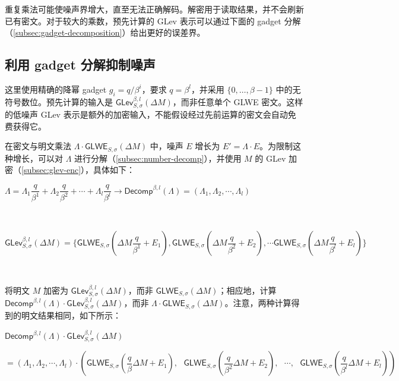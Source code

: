 重复乘法可能使噪声界增大，直至无法正确解码。解密用于读取结果，并不会刷新已有密文。对于较大的乘数，预先计算的 GLev 表示可以通过下面的 gadget 分解（\autoref{subsec:gadget-decomposition}）给出更好的误差界。

\subsection{利用 gadget 分解抑制噪声}
\label{subsubsec:gadget-decomposition-noise-suppression}

这里使用精确的降幂 gadget $g_i=q/\beta^i$，要求 $q=\beta^l$，并采用 $\{0,\ldots,\beta-1\}$ 中的无符号数位。预先计算的输入是 $\textsf{GLev}^{\beta,l}_{S,\sigma}(\Delta M)$，而非任意单个 GLWE 密文。这样的低噪声 GLev 表示是额外的加密输入，不能假设经过先前运算的密文会自动免费获得它。

在密文与明文乘法 $\Lambda \cdot \textsf{GLWE}_{S, \sigma}(\Delta M)$ 中，噪声 $E$ 增长为 $E' = \Lambda \cdot E$。为限制这种增长，可以对 $\Lambda$ 进行分解（\autoref{subsec:number-decomp}），并使用 $M$ 的 GLev 加密（\autoref{subsec:glev-enc}），具体如下：


$\Lambda = \Lambda_1 \dfrac{q}{\beta^1} + \Lambda_2 \dfrac{q}{\beta^2} + \cdots + \Lambda_l \dfrac{q}{\beta^l} \longrightarrow \textsf{Decomp}^{\beta, l}(\Lambda) = (\Lambda_1, \Lambda_2, \cdots, \Lambda_l)$

$ $

$\textsf{GLev}_{S, \sigma}^{\beta, l}(\Delta M) = \Bigg\{ \textsf{GLWE}_{S, \sigma}\left(\Delta M \dfrac{q}{\beta^1} + E_1\right), \textsf{GLWE}_{S, \sigma}\left(\Delta M \dfrac{q}{\beta^2} + E_2\right), \cdots \textsf{GLWE}_{S, \sigma}\left(\Delta M \dfrac{q}{\beta^l} + E_l\right) \Bigg\}$

$ $


将明文 $M$ 加密为 $\textsf{GLev}_{S, \sigma}^{\beta, l}(\Delta M)$，而非 $\textsf{GLWE}_{S, \sigma}(\Delta M)$；相应地，计算 $\textsf{Decomp}^{\beta, l}(\Lambda) \cdot \textsf{GLev}_{S, \sigma}^{\beta, l}(\Delta M)$，而非 $\Lambda \cdot \textsf{GLWE}_{S, \sigma}(\Delta M)$。注意，两种计算得到的明文结果相同，如下所示：

$\textsf{Decomp}^{\beta, l}(\Lambda) \cdot \textsf{GLev}_{S, \sigma}^{\beta, l}(\Delta M)$

$= (\Lambda_1, \Lambda_2, \cdots, \Lambda_l) \cdot \left (\textsf{GLWE}_{S, \sigma}\left(\dfrac{q}{\beta} \Delta M + E_1\right), \text{ } \textsf{GLWE}_{S, \sigma}\left(\dfrac{q}{\beta^2} \Delta M + E_2\right), \text{ } \cdots, \text{ } \textsf{GLWE}_{S, \sigma}\left(\dfrac{q}{\beta^l} \Delta M + E_l\right) \right )$

